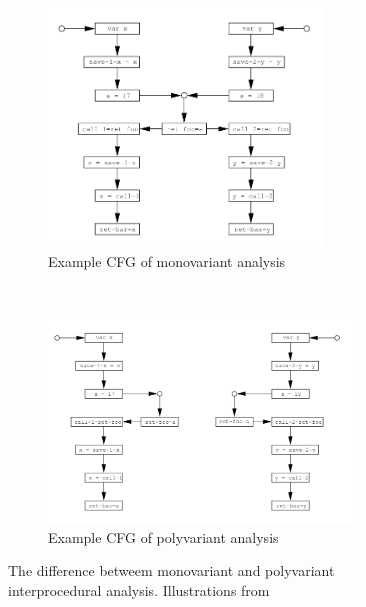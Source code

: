 \begin{figure}[H]

  \begin{subfigure}[b]{\textwidth}
    \centering
    \includegraphics[width=0.8\textwidth]{figures/monovariant}
    \caption{Example CFG of monovariant analysis}
    \label{monovariant}
  \end{subfigure}
 ~ 
  \begin{subfigure}[b]{\textwidth}
    \centering
    \includegraphics[width=0.9\textwidth]{figures/polyvariant}
    \caption{Example CFG of polyvariant analysis}
    \label{polyvariant}
  \end{subfigure}
  
  \caption{The difference betweem monovariant and polyvariant interprocedural analysis. Illustrations from \citet[p.~40]{schwartzbach}}
  \label{monopoly}
\end{figure}
